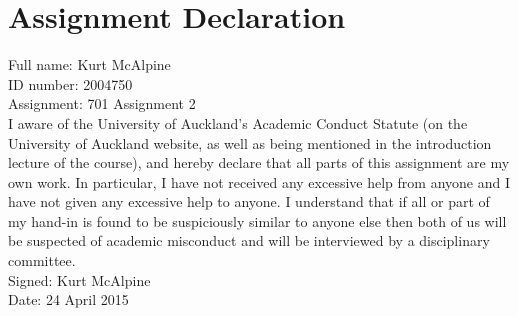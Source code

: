 \documentclass{article}
\begin{document}
\section*{Assignment Declaration}

\noindent
Full name: Kurt McAlpine\\
ID number: 2004750\\
Assignment: 701 Assignment 2\\

\noindent
I aware of the University of Auckland's Academic Conduct Statute (on the
University of Auckland website, as well as being mentioned in the introduction
lecture of the course), and hereby declare that all parts of this assignment
are my own work. In particular, I have not received any excessive help from
anyone and I have not given any excessive help to anyone. I understand that if
all or part of my hand-in is found to be suspiciously similar to anyone else
then both of us will be suspected of academic misconduct and will be
interviewed by a disciplinary committee.\\

\noindent
Signed: Kurt McAlpine\\
Date: 24 April 2015
\end{document}
